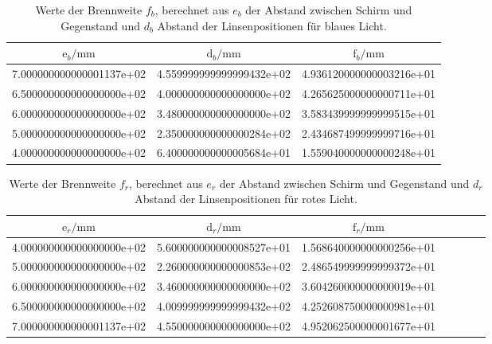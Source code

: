 \begin{table}
  \centering
  \begin{tabular}{S S S}
    \toprule
     $\text{e}_b / \si{\milli\meter}$ &
     $\text{d}_b /\si{\milli\meter} $ & $\text{f}_b / \si{\milli\meter} $\\
    \midrule
    7.000000000000001137e+02 & 4.559999999999999432e+02 & 4.936120000000003216e+01\\
    6.500000000000000000e+02 & 4.000000000000000000e+02 & 4.265625000000000711e+01\\
    6.000000000000000000e+02 & 3.480000000000000000e+02 & 3.583439999999999515e+01\\
    5.000000000000000000e+02 & 2.350000000000000284e+02 & 2.434687499999999716e+01\\
    4.000000000000000000e+02 & 6.400000000000005684e+01 & 1.559040000000000248e+01\\
    \bottomrule
  \end{tabular}
  \caption{Werte der Brennweite \texorpdfstring{$f_b$}{math}, berechnet aus
  \texorpdfstring{$e_b$}{math} der Abstand zwischen Schirm und Gegenstand und
  \texorpdfstring{$d_b$}{math} Abstand der Linsenpositionen für blaues Licht.}
  \label{tab:bb}
\end{table}
\begin{table}
  \centering
  \begin{tabular}{S S S S S S S}
    \toprule
      $\text{e}_r / \si{\milli\meter}$ &
     $\text{d}_r /\si{\milli\meter} $ & $\text{f}_r / \si{\milli\meter} $\\
    \midrule
    4.000000000000000000e+02 & 5.600000000000008527e+01 & 1.568640000000000256e+01\\
    5.000000000000000000e+02 & 2.260000000000000853e+02 & 2.486549999999999372e+01\\
    6.000000000000000000e+02 & 3.460000000000000000e+02 & 3.604260000000000019e+01\\
    6.500000000000000000e+02 & 4.009999999999999432e+02 & 4.252608750000000981e+01\\
    7.000000000000001137e+02 & 4.550000000000000000e+02 & 4.952062500000001677e+01\\
    \bottomrule
  \end{tabular}
  \caption{Werte der Brennweite \texorpdfstring{$f_r$}{math}, berechnet aus
  \texorpdfstring{$e_r$}{math} der Abstand zwischen Schirm und Gegenstand und
  \texorpdfstring{$d_r$}{math} Abstand der Linsenpositionen für rotes Licht.}
  \label{tab:br}
\end{table}




